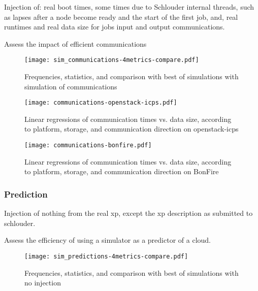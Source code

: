 \documentclass[a4paper,10pt]{article}
\newcommand\vrpath{../../lab/setup/simschlouder/validation-results/}
\begin{document}
Injection of: real boot times, some times due to Schlouder internal threads, 
such as lapses after a node become ready and the start of the first job, 
and, real runtimes and real data size for jobs input and output communications.

Assess the impact of efficient communications 

\begin{figure}
  \centering
  \texttt{[image: sim\_communications-4metrics-compare.pdf]}
  
  

  

  

  \caption{Frequencies, statistics, and comparison with best of simulations with simulation of communications}
\end{figure} 

\begin{figure}
  \centering
  \texttt{[image: communications-openstack-icps.pdf]}
  
  \caption{Linear regressions of communication times vs. data size, 
    according to platform, storage, and communication direction on openstack-icps}
\end{figure} 


\begin{figure}
  \centering
  \texttt{[image: communications-bonfire.pdf]}
  
  \caption{Linear regressions of communication times vs. data size, 
    according to platform, storage, and communication direction on BonFire}
\end{figure} 


\subsubsection{Prediction}

Injection of nothing from the real xp, except the xp description as submitted 
to schlouder.

Assess the efficiency of using a simulator as a predictor of a cloud.

\begin{figure}
  \centering
  \texttt{[image: sim\_predictions-4metrics-compare.pdf]}
  
  

  

  

  
  \caption{Frequencies, statistics, and comparison with best of simulations with no injection}
\end{figure} 
\end{document}
